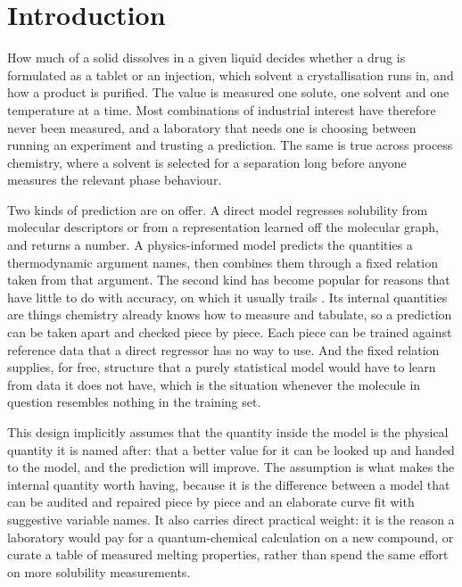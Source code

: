 \section{Introduction}
\label{sec:intro}

How much of a solid dissolves in a given liquid decides whether a drug is formulated as a tablet
or an injection, which solvent a crystallisation runs in, and how a product is purified. The value
is measured one solute, one solvent and one temperature at a time. Most combinations of industrial
interest have therefore never been measured, and a laboratory that needs one is choosing between
running an experiment and trusting a prediction. The same is true across process chemistry, where
a solvent is selected for a separation long before anyone measures the relevant phase behaviour.

Two kinds of prediction are on offer. A direct model regresses solubility from molecular
descriptors or from a representation learned off the molecular graph, and returns a number. A
physics-informed model predicts the quantities a thermodynamic argument names, then combines them
through a fixed relation taken from that argument. The second kind has become popular for reasons
that have little to do with accuracy, on which it usually trails
\cite{osanloo2024,vermeire2022solprop}. Its internal quantities are things chemistry already knows
how to measure and tabulate, so a prediction can be taken apart and checked piece by piece. Each
piece can be trained against reference data that a direct regressor has no way to use. And the
fixed relation supplies, for free, structure that a purely statistical model would have to learn
from data it does not have, which is the situation whenever the molecule in question resembles
nothing in the training set.

This design implicitly assumes that the quantity inside the model is the physical quantity it is
named after: that a better value for it can be looked up and handed to the model, and the
prediction will improve. The assumption is what makes the internal quantity worth having, because
it is the difference between a model that can be audited and repaired piece by piece and an
elaborate curve fit with suggestive variable names. It also carries direct practical weight: it is
the reason a laboratory would pay for a quantum-chemical calculation on a new compound, or curate
a table of measured melting properties, rather than spend the same effort on more solubility
measurements.

